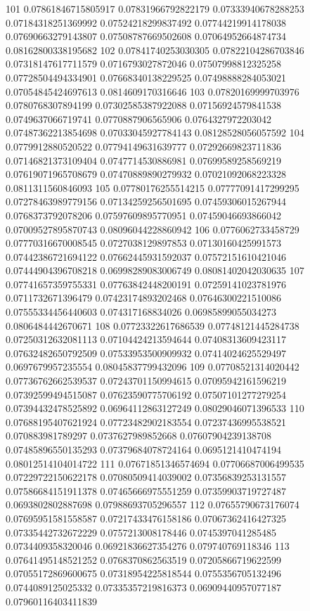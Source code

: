 101 0.07861846715805917 0.07831966792822179 0.07333940678288253 0.07184318251369992 0.07524218299837492 0.07744219914178038 0.07690663279143807 0.07508787669502608 0.07064952664874734 0.08162800338195682
102 0.07841740253030305 0.07822104286703846 0.07318147617711579 0.0716793027872046 0.07507998812325258 0.07728504494334901 0.07668340138229525 0.07498888284053021 0.07054845424697613 0.0814609170316646
103 0.07820169999703976 0.0780768307894199 0.07302585387922088 0.07156924579841538 0.0749637066719741 0.0770887906565906 0.0764327972203042 0.07487362213854698 0.07033045927784143 0.08128528056057592
104 0.0779912880520522 0.07794149631639777 0.07292669823711836 0.07146821373109404 0.0747714530886981 0.07699589258569219 0.07619071965708679 0.07470889890279932 0.07021092068223328 0.0811311560846093
105 0.07780176255514215 0.07777091417299295 0.07278463989779156 0.07134259256501695 0.07459306015267944 0.0768373792078206 0.07597609895770951 0.07459046693866042 0.07009527895870743 0.08096044228860942
106 0.0776062733458729 0.07770316670008545 0.0727038129897853 0.07130160425991573 0.07442386721694122 0.07662445931592037 0.07572151610421046 0.07444904396708218 0.06998289083006749 0.08081402042030635
107 0.07741657359755331 0.07763842448200191 0.07259141023781976 0.0711732671396479 0.07423174893202468 0.07646300221510086 0.07555334456440603 0.074317168834026 0.06985899055034273 0.0806484442670671
108 0.07723322617686539 0.07748121445284738 0.07250312632081113 0.07104424213594644 0.07408313609423117 0.07632482650792509 0.07533953500909932 0.07414024625529497 0.0697679957235554 0.08045837799432096
109 0.07708521314020442 0.07736762662539537 0.07243701150994615 0.07095942161596219 0.07392599494515087 0.07623590775706192 0.07507101277279254 0.07394432478525892 0.06964112863127249 0.08029046071396533
110 0.07688195407621924 0.07723482902183554 0.07237436995538521 0.070883981789297 0.0737627989852668 0.07607904239138708 0.07485896550135293 0.07379684078724164 0.0695121410474194 0.08012514104014722
111 0.07671851346574694 0.07706687006499535 0.07229722150622178 0.07080509414039002 0.07356839253131557 0.07586684151911378 0.07465666975551259 0.07359903719727487 0.0693802802887698 0.07988693705296557
112 0.07655790673176074 0.07695951581558587 0.07217433476158186 0.07067362416427325 0.07335442732672229 0.0757213008178446 0.0745397041285485 0.0734409358320046 0.06921836627354276 0.079740769118346
113 0.07641495148521252 0.0768370862563519 0.07205866719622599 0.07055172869600675 0.07318954225818544 0.0755356705132496 0.0744089125025332 0.07335357219816373 0.06909440957077187 0.07960116403411839
